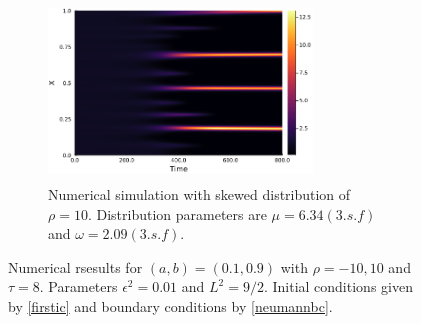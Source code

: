 \begin{figure}[H]
    \hfill
    \begin{subfigure}[t]{0.45\textwidth}
        \centering
        \includegraphics[width=7cm,height=4.75cm]{skewt810.png}
        \caption{Numerical simulation with skewed distribution of $\rho=10$. Distribution parameters are $\mu=6.34(3.s.f)$ and $\omega=2.09(3.s.f)$.}
        \label{}
    \end{subfigure}
    \caption{Numerical rsesults for $(a,b)=(0.1,0.9)$ with $\rho=-10,10$ and $\tau=8$. Parameters $\epsilon^2=0.01$ and $L^2=9/2$. Initial conditions given by \eqref{firstic} and boundary conditions by \eqref{neumannbc}.}
    \label{fig:linskew2}
\end{figure}

